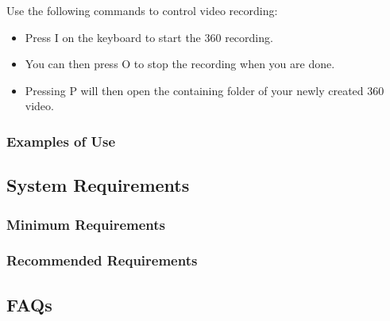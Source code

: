 			Use the following commands to control video recording:
			
			\begin{itemize}
				
				\item Press I on the keyboard to start the 360 recording.  
				
				\item You can then press O to stop the recording when you are done.  
				
				\item Pressing P will then open the containing folder of your newly created 360 video.  
				
			\end{itemize}
			
			
		\subsubsection{Examples of Use}
	
	\subsection{System Requirements}
		
		\subsubsection{Minimum Requirements}
		
		\subsubsection{Recommended Requirements}
	
	\subsection{FAQs}